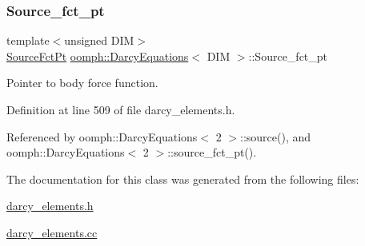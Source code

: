 \subsubsection{\texorpdfstring{Source\+\_\+fct\+\_\+pt}{Source\_fct\_pt}}
{\footnotesize\ttfamily template$<$unsigned D\+IM$>$ \\
\hyperlink{classoomph_1_1DarcyEquations_adcf88d9573b0f1c1988bdae6234eb7f8}{Source\+Fct\+Pt} \hyperlink{classoomph_1_1DarcyEquations}{oomph\+::\+Darcy\+Equations}$<$ D\+IM $>$\+::Source\+\_\+fct\+\_\+pt\hspace{0.3cm}{\ttfamily [private]}}



Pointer to body force function. 



Definition at line 509 of file darcy\+\_\+elements.\+h.



Referenced by oomph\+::\+Darcy\+Equations$<$ 2 $>$\+::source(), and oomph\+::\+Darcy\+Equations$<$ 2 $>$\+::source\+\_\+fct\+\_\+pt().



The documentation for this class was generated from the following files\+:\begin{DoxyCompactItemize}
\item 
\hyperlink{darcy__elements_8h}{darcy\+\_\+elements.\+h}\item 
\hyperlink{darcy__elements_8cc}{darcy\+\_\+elements.\+cc}\end{DoxyCompactItemize}
